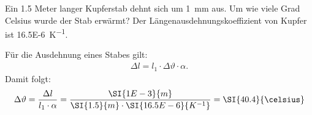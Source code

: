 
\begin{aufgabe}
	Ein \num{1.5} Meter langer Kupferstab dehnt sich um \SI{1}{mm} aus. Um wie viele Grad Celsius wurde der Stab erwärmt?
	Der Längenausdehnungskoeffizient von Kupfer ist \SI{16.5E-6}{K^{-1}}.
	\begin{loesung}
		Für die Ausdehnung eines Stabes gilt:
		\begin{eqnarray*}
			\Delta l = l_1\cdot\Delta\vartheta\cdot\alpha\text{.}
		\end{eqnarray*}
		Damit folgt:
		\begin{eqnarray*}
			\Delta\vartheta=\frac{\Delta l}{l_1\cdot\alpha}=\frac{\SI{1E-3}{m}}{\SI{1.5}{m}\cdot\SI{16.5E-6}{K^{-1}}}=\SI{40.4}{\celsius}
		\end{eqnarray*}
	\end{loesung}
\end{aufgabe}
